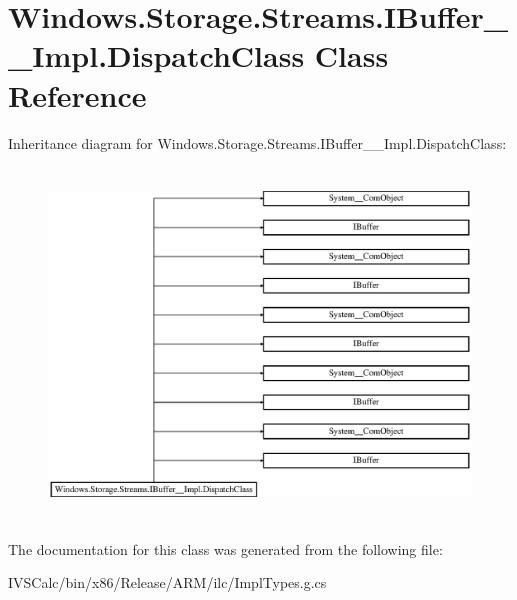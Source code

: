 \hypertarget{class_windows_1_1_storage_1_1_streams_1_1_i_buffer_____impl_1_1_dispatch_class}{}\section{Windows.\+Storage.\+Streams.\+I\+Buffer\+\_\+\+\_\+\+Impl.\+Dispatch\+Class Class Reference}
\label{class_windows_1_1_storage_1_1_streams_1_1_i_buffer_____impl_1_1_dispatch_class}
Inheritance diagram for Windows.\+Storage.\+Streams.\+I\+Buffer\+\_\+\+\_\+\+Impl.\+Dispatch\+Class\+:\begin{figure}[H]
\begin{center}
\leavevmode
\includegraphics[height=9.361702cm]{class_windows_1_1_storage_1_1_streams_1_1_i_buffer_____impl_1_1_dispatch_class}
\end{center}
\end{figure}


The documentation for this class was generated from the following file\+:\begin{DoxyCompactItemize}
\item 
I\+V\+S\+Calc/bin/x86/\+Release/\+A\+R\+M/ilc/Impl\+Types.\+g.\+cs\end{DoxyCompactItemize}
